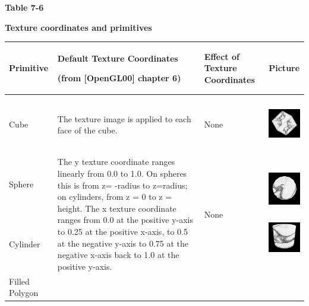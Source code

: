 
{\centering\sffamily\bfseries
Table 7-6
\par}

{\centering\sffamily\bfseries
Texture coordinates and primitives
\par}

\begin{center}
\tablehead{}
\begin{supertabular}{|m{0.7122598in}|m{3.22956in}|m{0.9816598in}|m{0.7559598in}|}
\hline
Primitive &
Default Texture Coordinates

(from [OpenGL00] chapter 6) &
Effect of Texture Coordinates &
Picture\\\hline
Cube &
The texture image is applied to each face of the cube.  &
None &
\begin{center}
\includegraphics[width=0.6602in,height=0.6602in]{ub-img/ub-img24.jpg}
\end{center}
\\\hline
Sphere

~

~

Cylinder &
The y texture coordinate ranges linearly from 0.0 to 1.0. On spheres
this is from\newline
z= -radius to z=radius; on cylinders, from\newline
z = 0 to z = height. The x texture coordinate ranges from 0.0 at the
positive y-axis to 0.25 at the positive x-axis, to 0.5 at the
negative\newline
y-axis to 0.75 at the negative x-axis back to 1.0 at the positive
y-axis.  &
None &


\begin{center}
\includegraphics[width=0.6602in,height=0.6602in]{ub-img/ub-img25.jpg}
\end{center}
\begin{center}
\includegraphics[width=0.6602in,height=0.6602in]{ub-img/ub-img26.jpg}
\end{center}
\\\hline
Filled Polygon


\end{supertabular}
\end{center}
